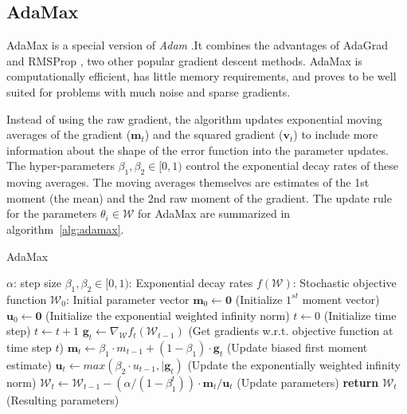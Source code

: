 \subsection{AdaMax}
AdaMax is a special version 
of \textit{Adam} \cite{kingma2014adam}.It combines the advantages of AdaGrad \cite{duchi2011adaptive} and RMSProp \cite{bengio2015rmsprop},
two other popular gradient descent methods. AdaMax is computationally efficient, has little
memory requirements, and proves to be well suited for problems with much noise and sparse gradients.

Instead of using the raw gradient, the algorithm updates exponential moving averages of the gradient ($\bm{m}_t$) and the squared gradient
($\bm{v}_t$) to include more information about the shape of the error function into the parameter updates. The hyper-parameters $\beta_1, \beta_2 \in [0, 1)$ control the exponential decay rates of these moving
averages. The moving averages themselves are estimates of the 1st moment (the mean) and the
2nd raw moment of the gradient. The update rule for the parameters $\theta_{i} \in \mathcal{W}$ for AdaMax are summarized in 
algorithm~\ref{alg:adamax}.

\begin{algorithm}
    \caption{AdaMax}
    \begin{algorithmic}[1]
        \Require $\alpha$: step size
        \Require $\beta_1, \beta_2 \in [0,1)$: Exponential decay rates
        \Require $f(\mathcal{W})$: Stochastic objective function
        \Require $\mathcal{W}_0$: Initial parameter vector
        \State $\bm{m}_0 \gets \bm{0}$ (Initialize $1^{st}$ moment vector)
        \State $\bm{u}_0 \gets \bm{0}$ (Initialize the exponential weighted infinity norm)
        \State $t \gets 0$ (Initialize time step)
            \State $t\gets t+1$
            \State $\bm{g}_t \gets \nabla_{\mathcal{W}}f_t(\mathcal{W}_{t-1})$ (Get gradients w.r.t. objective function at time step $t$)
            \State $\bm{m}_t \gets \beta_1 \cdot m_{t-1} + (1-\beta_1) \cdot \bm{g}_t$ (Update biased first moment estimate)
            \State $\bm{u}_t \gets max(\beta_2 \cdot u_{t-1}, \vert{\bm{g}_t})$ (Update the exponentially weighted infinity norm)
            \State $\mathcal{W}_t \gets \mathcal{W}_{t-1} - (\alpha/ (1-\beta_1^t)) \cdot \bm{m}_t/\bm{u}_t$ (Update parameters)
        \EndWhile
        \State \textbf{return} $\mathcal{W}_t$ (Resulting parameters)
    \end{algorithmic}
    \label{alg:adamax}
\end{algorithm}


